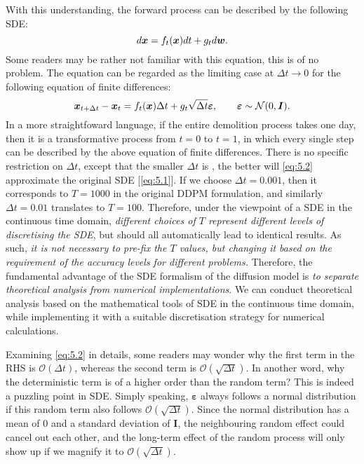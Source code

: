 With this understanding, the forward process can be described by the following SDE:
\begin{equation}
    \label{eq:5.1}
    d\bm{x}=f_t(\bm{x})dt+g_t d\bm{w}.
\end{equation}
Some readers may be rather not familiar with this equation, this is of no problem. The equation can be regarded as the limiting case at $\Delta t\to 0$ for the following equation of finite differences:
\begin{equation}
    \label{eq:5.2}
    \bm{x}_{t+\Delta t}-\bm{x}_t=f_t(\bm{x})\Delta t+g_t\sqrt{\Delta t }\bm{\varepsilon},\qquad \bm{\varepsilon}\sim\mathcal{N}(0,\bm{I}).
\end{equation}
In a more straightfoward language, if the entire demolition process takes one day, then it is a transformative process from $t=0$ to $t=1$, in which every single step can be described by the above equation of finite differences. There is no specific restriction on $\Delta t$, except that the smaller $\Delta t$ is , the better will \cref{eq:5.2} approximate the original SDE [\cref{eq:5.1}]. If we choose $\Delta t=0.001$, then it corresponds to $T=1000$ in the original DDPM formulation, and similarly $\Delta t=0.01$ translates to $T=100$. Therefore, under the viewpoint of a SDE in the continuous time domain, \emph{different choices of $T$ represent different levels of discretising the SDE}, but should all automatically lead to identical results. As such, \textit{it is not  necessary to pre-fix the $T$ values, but changing it based on the requirement of the accuracy levels for different problems.} Therefore, the fundamental advantage of the SDE formalism of the diffusion model is \emph{to separate theoretical analysis from numerical implementations}. We can conduct theoretical analysis based on the mathematical tools of SDE in the continuous time domain, while implementing it with a suitable discretisation strategy for numerical calculations.

Examining \cref{eq:5.2} in details, some readers may wonder why the first term in the RHS is $\mathcal{O}(\Delta t)$, whereas the second term is $\mathcal{O}(\sqrt{\Delta t})$. In another word, why the deterministic term is of a higher order than the random term? This is indeed a puzzling point in SDE. Simply speaking, $\bm{\varepsilon}$ always follows a normal distribution if this random term also follows $\mathcal{O}(\sqrt{\Delta t})$. Since the normal distribution has a mean of 0 and a standard deviation of $\bm{I}$, the neighbouring random effect could cancel out each other, and the long-term effect of the random process will only show up if we magnify it to $\mathcal{O}(\sqrt{\Delta t})$.

